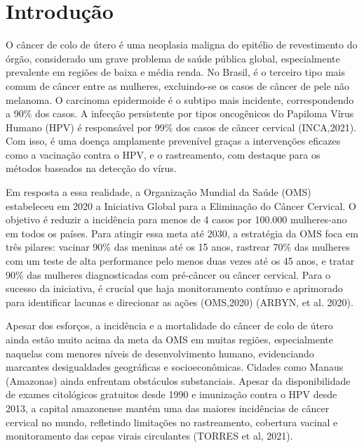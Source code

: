 \chapter*[Introdução]{Introdução}

O câncer de colo de útero é uma neoplasia maligna do epitélio de revestimento do órgão, considerado um grave problema de saúde pública global, especialmente prevalente em regiões de baixa e média renda. No Brasil,  é o terceiro tipo mais comum de câncer entre as mulheres, excluindo-se os casos de câncer de pele não melanoma. O carcinoma epidermoide é o subtipo mais incidente, correspondendo a 90\% dos casos. A infecção persistente por tipos oncogênicos do Papiloma Vírus Humano (HPV) é responsável por 99\% dos casos de câncer cervical (INCA,2021). Com isso, é uma doença amplamente prevenível graças a intervenções eficazes como a vacinação contra o HPV, e o rastreamento, com destaque para os métodos baseados na detecção do vírus.

Em resposta a essa realidade, a Organização Mundial da Saúde (OMS) estabeleceu em 2020 a Iniciativa Global para a Eliminação do Câncer Cervical. O objetivo é reduzir a incidência para menos de 4 casos por 100.000 mulheres-ano em todos os países. Para atingir essa meta até 2030, a estratégia da OMS foca em três pilares: vacinar 90\% das meninas até os 15 anos, rastrear 70\% das mulheres com um teste de alta performance pelo menos duas vezes até os 45 anos, e tratar 90\% das mulheres diagnosticadas com pré-câncer ou câncer cervical. Para o sucesso da iniciativa, é crucial que haja monitoramento contínuo e aprimorado para identificar lacunas e direcionar as ações (OMS,2020) (ARBYN, et al. 2020).

Apesar dos esforços, a incidência e a mortalidade do câncer de colo de útero ainda estão muito acima da meta da OMS em muitas regiões, especialmente naquelas com menores níveis de desenvolvimento humano, evidenciando marcantes desigualdades geográficas e socioeconômicas. Cidades como Manaus (Amazonas) ainda enfrentam obstáculos substanciais. Apesar da disponibilidade de exames citológicos gratuitos desde 1990 e imunização contra o HPV desde 2013, a capital amazonense mantém uma das maiores incidências de câncer cervical no mundo, refletindo limitações no rastreamento, cobertura vacinal e monitoramento das cepas virais circulantes (TORRES et al, 2021). 

